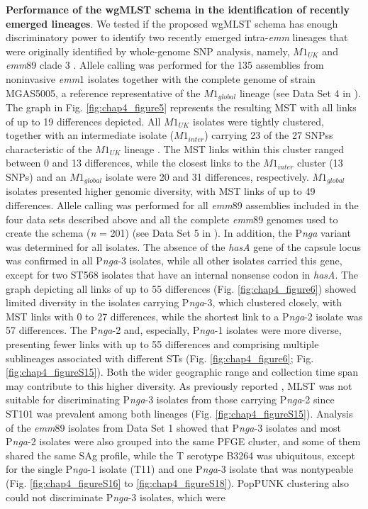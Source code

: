 \textbf{Performance of the wgMLST schema in the identification of recently emerged lineages}. We tested if the proposed \ac{wgMLST} schema has enough discriminatory power to identify two recently emerged intra-\textit{emm} lineages that were originally identified by whole-genome \ac{SNP} analysis, namely, $M1_{UK}$ and \textit{emm}89 clade 3 \cite{turner_emergence_2015, zhu_molecular_2015, lynskey_emergence_2019}. Allele calling was performed for the 135 assemblies from noninvasive \textit{emm}1 isolates \cite{lynskey_emergence_2019} together with the complete genome of strain MGAS5005, a reference representative of the $M1_{global}$ lineage (see Data Set 4 in \cite{friaes_supplemental_2023}). The graph in Fig. \ref{fig:chap4_figure5} represents the resulting \ac{MST} with all links of up to 19 differences depicted. All $M1_{UK}$ isolates were tightly clustered, together with an intermediate isolate ($M1_{inter}$) carrying 23 of the 27 \acp{SNP}s characteristic of the $M1_{UK}$ lineage \cite{lynskey_emergence_2019}. The \ac{MST} links within this cluster ranged between 0 and 13 differences, while the closest links to the $M1_{inter}$ cluster (13 \acp{SNP}) and an $M1_{global}$ isolate were 20 and 31 differences, respectively. $M1_{global}$ isolates presented higher genomic diversity, with \ac{MST} links of up to 49 differences. Allele calling was performed for all \textit{emm}89 assemblies included in the four data sets described above and all the complete \textit{emm}89 genomes used to create the schema (\textit{n} = 201) (see Data Set 5 in \cite{friaes_supplemental_2023}). In addition, the P\textit{nga} variant was determined for all isolates. The absence of the \textit{hasA} gene of the capsule locus was confirmed in all P\textit{nga}-3 isolates, while all other isolates carried this gene, except for two ST568 isolates that have an internal nonsense codon in \textit{hasA}. The graph depicting all links of up to 55 differences (Fig. \ref{fig:chap4_figure6}) showed limited diversity in the isolates carrying P\textit{nga}-3, which clustered closely, with \ac{MST} links with 0 to 27 differences, while the shortest link to a P\textit{nga}-2 isolate was 57 differences. The P\textit{nga}-2 and, especially, P\textit{nga}-1 isolates were more diverse, presenting fewer links with up to 55 differences and comprising multiple sublineages associated with different \ac{ST}s (Fig. \ref{fig:chap4_figure6}; Fig. \ref{fig:chap4_figureS15}). Both the wider geographic range and collection time span may contribute to this higher diversity. As previously reported \cite{friaes_emergence_2015}, \ac{MLST} was not suitable for discriminating P\textit{nga}-3 isolates from those carrying P\textit{nga}-2 since ST101 was prevalent among both lineages (Fig. \ref{fig:chap4_figureS15}). Analysis of the \textit{emm}89 isolates from Data Set 1 showed that P\textit{nga}-3 isolates and most P\textit{nga}-2 isolates were also grouped into the same \ac{PFGE} cluster, and some of them shared the same SAg profile, while the T serotype B3264 was ubiquitous, except for the single P\textit{nga}-1 isolate (T11) and one P\textit{nga}-3 isolate that was nontypeable (Fig. \ref{fig:chap4_figureS16} to \ref{fig:chap4_figureS18}). \ac{PopPUNK} clustering also could not discriminate P\textit{nga}-3 isolates, which were 